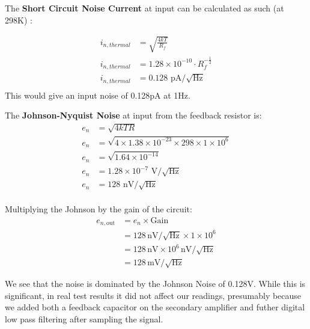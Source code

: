 The \textbf{Short Circuit Noise Current} at input can be calculated as such (at 298K) \cite[p.439]{RefWorks:horowitz2015theart}:

\begin{equation} \label{Thermal Current Noise}
  \begin{split}
  i_{n,thermal} &= \sqrt{\frac{4kT}{R_f}} \\
  i_{n,thermal} &= 1.28 \times 10^{-10} \cdot R_f^{-\frac{1}{2}} \\
  i_{n,thermal} &= 0.128\text{ pA}/\sqrt{\text{Hz}} \\
  \end{split}
  \end{equation}
This would give an input noise of 0.128pA at 1Hz.

The \textbf{Johnson-Nyquist Noise} at input from the feedback resistor is:
\begin{equation} \label{JohnsNoiseRf}
  \begin{split}
  e_n &= \sqrt{4kTR} \\
  e_n &= \sqrt{4 \times 1.38 \times 10^{-23} \times 298 \times 1 \times 10^6} \\
  e_n &= \sqrt{1.64 \times 10^{-14}} \\
  e_n &= 1.28 \times 10^{-7} \text{ V}/\sqrt{\text{Hz}} \\
  e_n &= 128 \text{ nV}/\sqrt{\text{Hz}} \\
  \end{split}
  \end{equation}


Multiplying the Johnson by the gain of the circuit:
\begin{equation} \label{Amplified Voltage Noise}
  \begin{split}
    e_{n,\text{out}} &= e_n \times \text{Gain} \\
    &= 128\,\text{nV}/\sqrt{\text{Hz}} \times 1 \times 10^6 \\
    &= 128\,\text{nV} \times 10^6\,\text{nV}/\sqrt{\text{Hz}} \\
    &= 128\,\text{mV}/\sqrt{\text{Hz}}
  \end{split}
\end{equation}

We see that the noise is dominated by the Johnson Noise of 0.128V.  While this is significant, in real test results it did not affect our readings, presumably because we added both a feedback capacitor on the secondary amplifier and futher digital low pass filtering after sampling the signal. 

